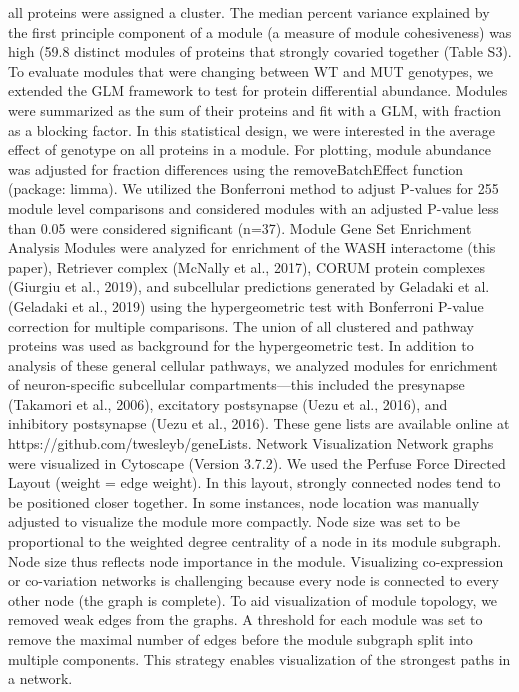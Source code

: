 all proteins were assigned a cluster. The median percent variance explained by
the first principle component of a module (a measure of module cohesiveness) was
high (59.8%
distinct modules of proteins that strongly covaried together (Table S3). 
To evaluate modules that were changing between WT and MUT genotypes, we extended
the GLM framework to test for protein differential abundance. Modules were
summarized as the sum of their proteins and fit with a GLM, with fraction as a
blocking factor. In this statistical design, we were interested in the average
effect of genotype on all proteins in a module. For plotting, module abundance
was adjusted for fraction differences using the removeBatchEffect function
(package: limma).  We utilized the Bonferroni method to adjust P-values for 255
module level comparisons and considered modules with an adjusted P-value less
than 0.05 were considered significant (n=37).
Module Gene Set Enrichment Analysis
Modules were analyzed for enrichment of the WASH interactome (this paper),
Retriever complex (McNally et al., 2017), CORUM protein complexes (Giurgiu et
al., 2019), and subcellular predictions generated by Geladaki et al.(Geladaki et
al., 2019) using the hypergeometric test with Bonferroni P-value correction for
multiple comparisons. The union of all clustered and pathway proteins was used
as background for the hypergeometric test. In addition to analysis of these
general cellular pathways, we analyzed modules for enrichment of neuron-specific
subcellular compartments—this included the presynapse (Takamori et al., 2006),
excitatory postsynapse (Uezu et al., 2016), and inhibitory postsynapse (Uezu et
al., 2016). These gene lists are available online at
https://github.com/twesleyb/geneLists.
Network Visualization
Network graphs were visualized in Cytoscape (Version 3.7.2). We used the Perfuse
Force Directed Layout (weight = edge weight). In this layout, strongly connected
nodes tend to be positioned closer together. In some instances, node location
was manually adjusted to visualize the module more compactly. Node size was set
to be proportional to the weighted degree centrality of a node in its module
subgraph. Node size thus reflects node importance in the module. Visualizing
co-expression or co-variation networks is challenging because every node is
connected to every other node (the graph is complete). To aid visualization of
module topology, we removed weak edges from the graphs. A threshold for each
module was set to remove the maximal number of edges before the module subgraph
split into multiple components. This strategy enables visualization of the
strongest paths in a network.

